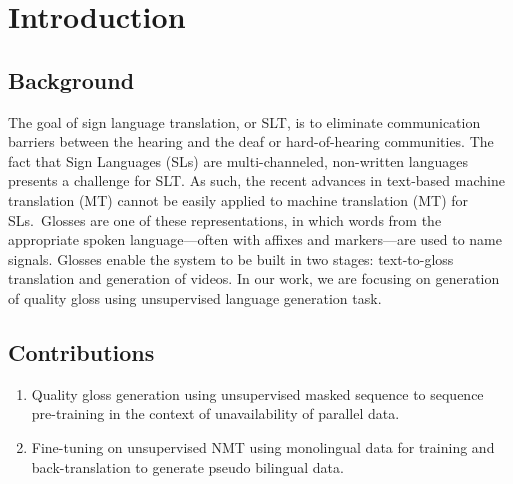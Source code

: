 \section{Introduction} \label{sec:Introduction}

\subsection{Background}
The goal of sign language translation, or SLT, is to eliminate communication barriers between the hearing and the deaf or hard-of-hearing communities. The fact that Sign Languages (SLs) are multi-channeled, non-written languages presents a challenge for SLT. As such, the recent advances in text-based machine translation (MT) cannot be easily applied to machine translation (MT) for SLs. Glosses are one of these representations, in which words from the appropriate spoken language—often with affixes and markers—are used to name signals. Glosses enable the system to be built in two stages: text-to-gloss translation and generation of videos. In our work, we are focusing on generation of quality gloss using unsupervised language generation task.


\subsection{Contributions}
\begin{enumerate}
\item Quality gloss generation using unsupervised masked sequence to sequence pre-training in the context of unavailability of parallel data.
\item Fine-tuning on unsupervised NMT using monolingual data for training and back-translation to generate pseudo bilingual data.
\end{enumerate}